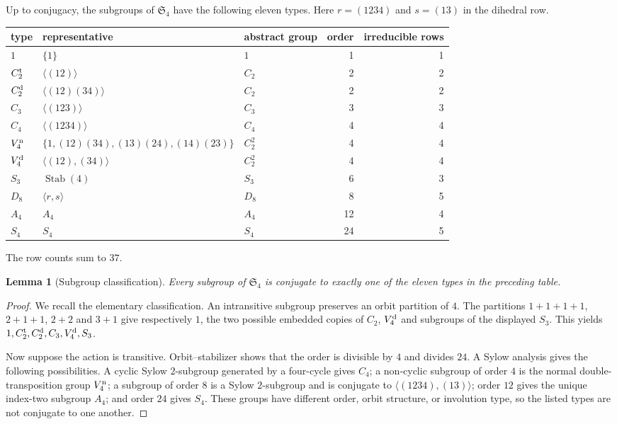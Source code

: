 \documentclass[11pt]{article}
\newtheorem{lemma}[theorem]{Lemma}
\theoremstyle{definition}
\newcommand{\Sn}{\mathfrak S}
\begin{document}
Up to conjugacy, the subgroups of $\Sn_4$ have the following eleven types.
Here $r=(1234)$ and $s=(13)$ in the dihedral row.
\begin{center}
\begin{tabular}{@{}lllrr@{}}
\toprule
type & representative & abstract group & order & irreducible rows\\
\midrule
$1$ & $\{1\}$ & $1$ & 1&1\\
$C_2^{\rm t}$ & $\langle(12)\rangle$ & $C_2$ &2&2\\
$C_2^{\rm d}$ & $\langle(12)(34)\rangle$ & $C_2$ &2&2\\
$C_3$ & $\langle(123)\rangle$ & $C_3$ &3&3\\
$C_4$ & $\langle(1234)\rangle$ & $C_4$ &4&4\\
$V_4^{\rm n}$ & $\{1,(12)(34),(13)(24),(14)(23)\}$ & $C_2^2$ &4&4\\
$V_4^{\rm d}$ & $\langle(12),(34)\rangle$ & $C_2^2$ &4&4\\
$S_3$ & $\operatorname{Stab}(4)$ & $S_3$ &6&3\\
$D_8$ & $\langle r,s\rangle$ & $D_8$ &8&5\\
$A_4$ & $A_4$ & $A_4$ &12&4\\
$S_4$ & $S_4$ & $S_4$ &24&5\\
\bottomrule
\end{tabular}
\end{center}
The row counts sum to $37$.

\begin{lemma}[Subgroup classification]\label{lem:subgroup-classification}
Every subgroup of $\Sn_4$ is conjugate to exactly one of the eleven types in
the preceding table.
\end{lemma}

\begin{proof}
We recall the elementary classification.  An intransitive subgroup preserves
an orbit partition of $4$.  The partitions $1+1+1+1$, $2+1+1$, $2+2$ and
$3+1$ give respectively $1$, the two possible embedded copies of $C_2$,
$V_4^{\rm d}$ and subgroups of the displayed $S_3$.  This yields
$1,C_2^{\rm t},C_2^{\rm d},C_3,V_4^{\rm d},S_3$.

Now suppose the action is transitive.  Orbit--stabilizer shows that the order
is divisible by $4$ and divides $24$.  A Sylow analysis gives the following
possibilities.  A cyclic Sylow $2$-subgroup generated by a four-cycle gives
$C_4$; a non-cyclic subgroup of order $4$ is the normal double-transposition
group $V_4^{\rm n}$; a subgroup of order $8$ is a Sylow $2$-subgroup and is
conjugate to $\langle(1234),(13)\rangle$; order $12$ gives the unique
index-two subgroup $A_4$; and order $24$ gives $S_4$.  These groups have
different order, orbit structure, or involution type, so the listed types are
not conjugate to one another.
\end{proof}
\end{document}
